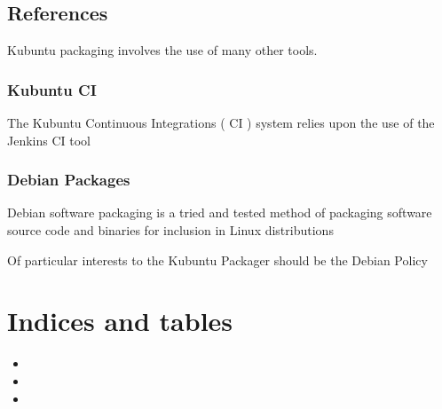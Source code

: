 \documentclass[letterpaper,10pt,english]{sphinxmanual}
\begin{document}
\section{References}
\label{\detokenize{docs/appendix/references:references}}\label{\detokenize{docs/appendix/references::doc}}
\sphinxAtStartPar
Kubuntu packaging involves the use of many other tools.


\subsection{Kubuntu CI}
\label{\detokenize{docs/appendix/references:kubuntu-ci}}
\sphinxAtStartPar
The Kubuntu Continuous Integrations ( CI ) system relies upon the use of the Jenkins CI tool

\sphinxAtStartPar
{}


\subsection{Debian Packages}
\label{\detokenize{docs/appendix/references:debian-packages}}
\sphinxAtStartPar
Debian software packaging is a tried and tested method of packaging software source code and binaries for inclusion in Linux distributions

\sphinxAtStartPar
Of particular interests to the Kubuntu Packager should be the Debian Policy

\sphinxAtStartPar
{}


\chapter{Indices and tables}
\label{\detokenize{index:indices-and-tables}}\begin{itemize}
\item {} 
\sphinxAtStartPar
{}

\item {} 
\sphinxAtStartPar
{}

\item {} 
\sphinxAtStartPar
{}

\end{itemize}



\renewcommand{\indexname}{Index}
\printindex
\end{document}
